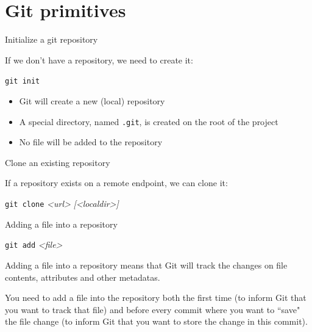 
\section{Git primitives}

\begin{frame}[fragile]{Initialize a git repository}

If we don't have a repository, we need to create it:

\vspace{2em}

\Large \texttt{git init}

\vspace{2em}

\normalsize
\begin{itemize}
  \item Git will create a new (local) repository
  \item A special directory, named \texttt{.git}, is created on the root of the
  project
  \item No file will be added to the repository
\end{itemize}

\end{frame}


\begin{frame}[fragile]{Clone an existing repository}

If a repository exists on a remote endpoint, we can clone it:

\vspace{2em}

\Large \texttt{git clone} \textit{<url>} \textit{[<localdir>]}

\vspace{2em}

\end{frame}


\begin{frame}[fragile]{Adding a file into a repository}

\vspace{2em}

\Large \texttt{git add} \textit{<file>}

\vspace{2em}

\normalsize
Adding a file into a repository means that Git will track the changes on file
contents, attributes and other metadatas.

You need to add a file into the repository both the first time (to inform Git that
you want to track that file) and before every commit where you want to ``save"
the file change (to inform Git that you want to store the change in this commit).

\end{frame}


